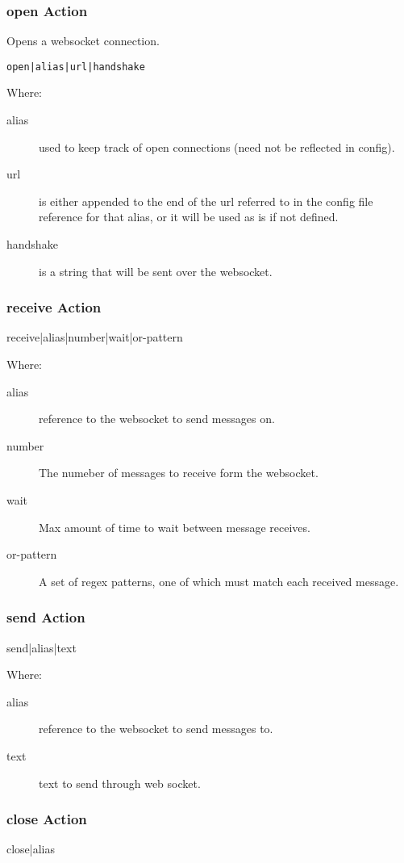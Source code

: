 \documentclass[12pt,a4paper,koma]{article}
\begin{document}
\subsubsection{open Action}
\label{sec-6-2-1}
Opens a websocket connection.
\begin{verbatim}
open|alias|url|handshake
\end{verbatim}
Where:
\begin{description}
\item[{alias}] used to keep track of open connections (need not be
reflected in config).
\item[{url}] is either appended to the end of the url referred to in the
config file reference for that alias, or it will be used as
is if not defined.
\item[{handshake}] is a string that will be sent over the websocket.
\end{description}
\subsubsection{receive Action}
\label{sec-6-2-2}
receive|alias|number|wait|or-pattern

Where:
\begin{description}
\item[{alias}] reference to the websocket to send messages on.
\item[{number}] The numeber of messages to receive form the websocket.
\item[{wait}] Max amount of time to wait between message receives.
\item[{or-pattern}] A set of regex patterns, one of which must match each
received message.
\end{description}
\subsubsection{send Action}
\label{sec-6-2-3}
send|alias|text

Where:
\begin{description}
\item[{alias}] reference to the websocket to send messages to.
\item[{text}] text to send through web socket.
\end{description}
\subsubsection{close Action}
\label{sec-6-2-4}
close|alias
\end{document}
